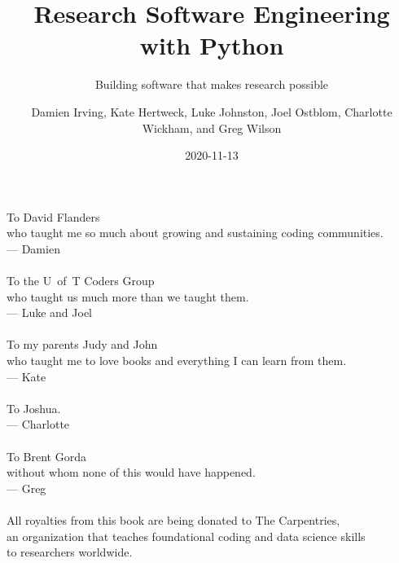 \documentclass[
]{krantz}
\title{Research Software Engineering with Python}
\subtitle{Building software that makes research possible}
\author{Damien Irving, Kate Hertweck, Luke Johnston, Joel Ostblom, Charlotte Wickham, and Greg Wilson}
\date{2020-11-13}
\begin{document}
\maketitle


\thispagestyle{empty}

\begin{center}
To David Flanders\\
who taught me so much about growing and sustaining coding communities.\\
--- Damien\\

~\\

To the U~of~T Coders Group\\
who taught us much more than we taught them.\\
--- Luke and Joel\\

~\\

To my parents Judy and John\\
who taught me to love books and everything I can learn from them.\\
--- Kate\\

~\\

To Joshua.\\
--- Charlotte\\

~\\

To Brent Gorda\\
without whom none of this would have happened.\\
--- Greg\\

~\\

All royalties from this book are being donated to The Carpentries,\\
an organization that teaches foundational coding and data science skills\\
to researchers worldwide.
\end{center}

\setlength{\abovedisplayskip}{-5pt}
\setlength{\abovedisplayshortskip}{-5pt}
\end{document}
